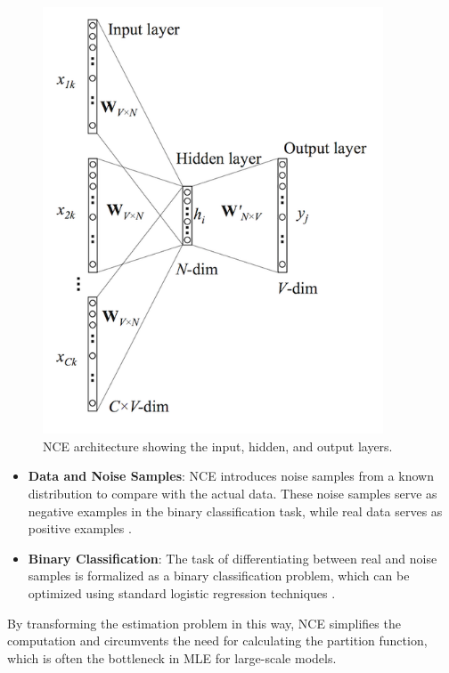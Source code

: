 \begin{figure}[H]
    \centering
    \includegraphics[width=0.9\textwidth]{./Images/NCE_structure.jpg}
    \caption{NCE architecture showing the input, hidden, and output layers.}
    \label{fig:NCE_structure}
\end{figure}

\begin{itemize}
    \item \textbf{Data and Noise Samples}: NCE introduces noise samples from a known distribution to compare with the actual data. These noise samples serve as negative examples in the binary classification task, while real data serves as positive examples \citep{10.48550/arxiv.1711.00658}.
    \item \textbf{Binary Classification}: The task of differentiating between real and noise samples is formalized as a binary classification problem, which can be optimized using standard logistic regression techniques \citep{10.18653/v1/e17-2003}.
\end{itemize}

By transforming the estimation problem in this way, NCE simplifies the computation and circumvents the need for calculating the partition function, which is often the bottleneck in MLE for large-scale models.


